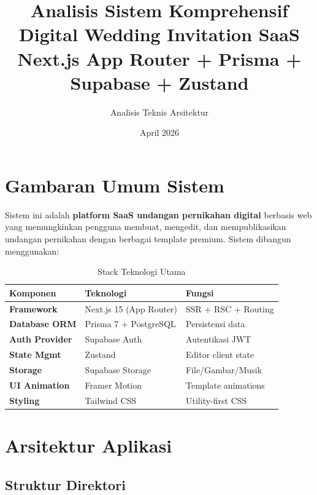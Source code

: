 \documentclass[12pt,a4paper]{article}
\title{
  \textbf{Analisis Sistem Komprehensif} \\
  \large Digital Wedding Invitation SaaS \\
  \normalsize Next.js App Router + Prisma + Supabase + Zustand
}
\author{Analisis Teknis Arsitektur}
\date{April 2026}
\begin{document}
\maketitle
\tableofcontents
\newpage

\section{Gambaran Umum Sistem}

Sistem ini adalah \textbf{platform SaaS undangan pernikahan digital} berbasis web yang
memungkinkan pengguna membuat, mengedit, dan mempublikasikan undangan pernikahan
dengan berbagai template premium. Sistem dibangun menggunakan:

\begin{table}[h]
\centering
\begin{tabular}{>{\bfseries}l l l}
\toprule
Komponen & Teknologi & Fungsi \\
\midrule
Framework      & Next.js 15 (App Router) & SSR + RSC + Routing \\
Database ORM   & Prisma 7 + PostgreSQL   & Persistensi data \\
Auth Provider  & Supabase Auth           & Autentikasi JWT \\
State Mgmt     & Zustand                 & Editor client state \\
Storage        & Supabase Storage        & File/Gambar/Musik \\
UI Animation   & Framer Motion           & Template animations \\
Styling        & Tailwind CSS            & Utility-first CSS \\
\bottomrule
\end{tabular}
\caption{Stack Teknologi Utama}
\end{table}

\section{Arsitektur Aplikasi}

\subsection{Struktur Direktori}
\end{document}
